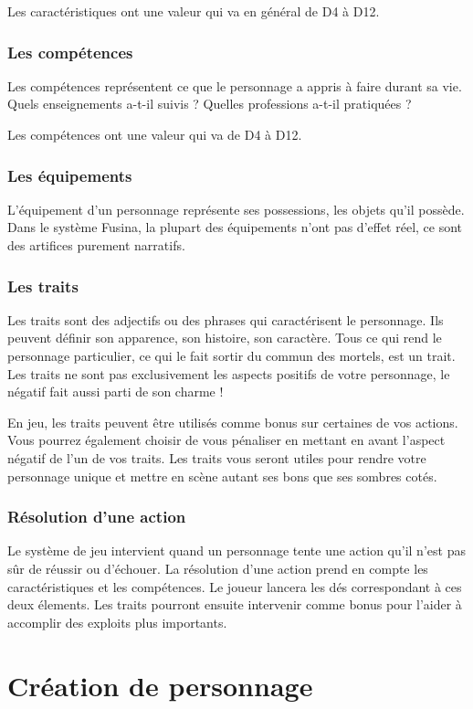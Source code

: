 \documentclass{conf/FusinaClass}
\begin{document}
Les caractéristiques ont une valeur qui va en général de D4 à D12. 

\section{Les compétences}
Les compétences représentent ce que le personnage a appris à faire durant sa vie. Quels enseignements a-t-il suivis ? Quelles professions a-t-il pratiquées ?

Les compétences ont une valeur qui va de D4 à D12.

\section{Les équipements}
L'équipement d'un personnage représente ses possessions, les objets qu'il possède. Dans le système Fusina, la plupart des équipements n'ont pas d'effet réel, ce sont des artifices purement narratifs. 

\section{Les traits}
Les traits sont des adjectifs ou des phrases qui caractérisent le personnage. Ils peuvent définir son apparence, son histoire, son caractère. Tous ce qui rend le personnage particulier, ce qui le fait sortir du commun des mortels, est un trait. Les traits ne sont pas exclusivement les aspects positifs de votre personnage, le négatif fait aussi parti de son charme !

En jeu, les traits peuvent être utilisés comme bonus sur certaines de vos actions. Vous pourrez également choisir de vous pénaliser en mettant en avant l'aspect négatif de l'un de vos traits. Les traits vous seront utiles pour rendre votre personnage unique et mettre en scène autant ses bons que ses sombres cotés.

\section{Résolution d'une action}
Le système de jeu intervient quand un personnage tente une action qu'il n'est pas sûr de réussir ou d'échouer. La résolution d'une action prend en compte les caractéristiques et les compétences. Le joueur lancera les dés correspondant à ces deux élements. Les traits pourront ensuite intervenir comme bonus pour l'aider à accomplir des exploits plus importants.


\part{Création de personnage}
\end{document}
